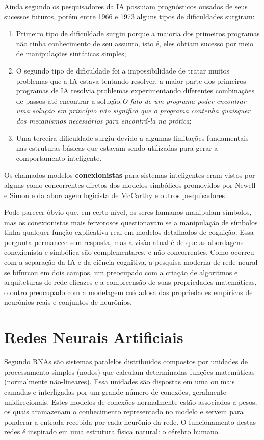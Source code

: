 \documentclass[
	12pt,				%
	openright,			%
	twoside,			%
	a4paper,			%
	english,			%
	french,				%
	spanish,			%
	brazil				%
	]{abntex2}
\begin{document}
Ainda segundo  os pesquisadores da IA possuiam prognósticos ousados de seus sucessos futuros, porém entre 1966 e 1973 alguns tipos de dificuldades surgiram: 
\begin{enumerate}
	\item Primeiro tipo de dificuldade surgiu porque a maioria dos primeiros programas não tinha conhecimento de seu assunto, isto é, eles obtiam sucesso por meio de manipulações sintáticas simples;
	\item O segundo tipo de dificuldade foi a impossibilidade de tratar muitos problemas que a IA estava tentando resolver, a maior parte dos primeiros programas de IA resolvia problemas experimentando diferentes combinações de passos até encontrar a solução.\emph{O fato de um programa poder encontrar uma solução em princípio não significa que o programa contenha quaisquer dos mecanismos necessários para encontrá-la na prótica};
	\item Uma terceira dificuldade surgiu devido a algumas limitações fundamentais nas estruturas básicas que estavam sendo utilizadas para gerar a comportamento inteligente.
\end{enumerate}  

Os chamados modelos \textbf{conexionistas} para sistemas inteligentes eram vistos por alguns como concorrentes diretos dos modelos simbólicos promovidos por Newell e Simon e da abordagem logicista de McCarthy e outros pesquisadores .%

Pode parecer óbvio que, em certo nível, os seres humanos manipulam símbolos, mas os conexionistas mais fervorosos questionavam se a manipulação de símbolos tinha qualquer função explicativa real em modelos detalhados de cognição. Essa pergunta permanece sem resposta, mas a visão atual é de que as abordagens conexionista e simbólica são complementares, e não concorrentes. Como ocorreu com a separação da IA e da ciência cognitiva, a pesquisa moderna de rede neural se bifurcou em dois campos, um preocupado com a criação de algoritmos e arquiteturas de rede eficazes e a compreensão de suas propriedades matemáticas, o outro preocupado com a modelagem cuidadosa das propriedades empíricas de neurônios reais e conjuntos de neurônios.\cite{russell2013inteligencia}

\section{Redes Neurais Artificiais}
Segundo  RNAs são sistemas paralelos distribuidos compostos por unidades de processamento simples (nodos) que calculam determinadas funções matemáticas (normalmente não-lineares). Essa unidades são dispostas em uma ou mais camadas e interligadas por um grande número de conexões, geralmente unidirecionais. Estes modelos de conexões normalmente estão associados a pesos, os quais aramazenam o conhecimento representado no modelo e servem para ponderar a entrada recebida por cada neurônio da rede. O funcionamento destas redes é inspirado em uma estrutura física natural: o cérebro humano.
\end{document}
